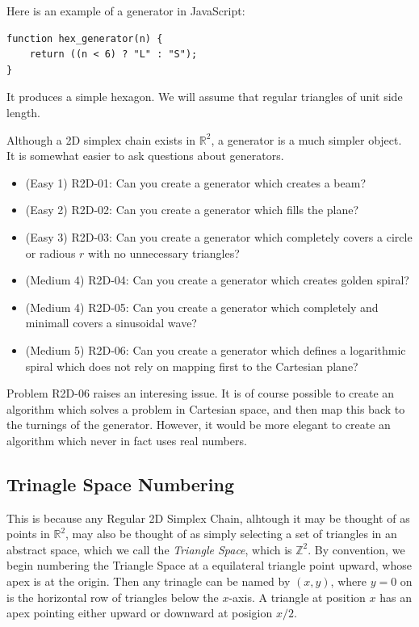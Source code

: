 \documentclass[11pt]{article}
\begin{document}
  Here is an example of a generator in JavaScript:
\begin{verbatim}
function hex_generator(n) {
    return ((n < 6) ? "L" : "S");
}
\end{verbatim}
It produces a simple hexagon. We will assume that regular triangles of unit side length.

Although a 2D simplex chain exists in $\mathbb{R}^2$, a generator is a much simpler object.  It is somewhat easier to ask questions about
generators.

\begin{itemize}
\item (Easy 1) R2D-01: Can you create a generator which creates a beam?
\item (Easy 2) R2D-02: Can you create a generator which fills the plane?
\item (Easy 3) R2D-03: Can you create a generator which completely covers a circle or radious $r$ with no unnecessary triangles?
\item (Medium 4) R2D-04: Can you create a generator which creates golden spiral?
\item (Medium 4) R2D-05: Can you create a generator which completely and minimall covers a sinusoidal wave?
  \item (Medium 5) R2D-06: Can you create a generator which defines a logarithmic spiral which does not rely on mapping first to the Cartesian plane?
\end{itemize}

Problem R2D-06 raises an interesing issue. It is of course possible to create an algorithm which solves a problem in Cartesian space, and then
map this back to the turnings of the generator. However, it would be more elegant to create an algorithm which never in fact uses real numbers.

\subsection{Trinagle Space Numbering}

This is because any Regular 2D Simplex Chain, alhtough it may be thought of as points in $\mathbb{R}^2$, may also be thought of as simply
selecting a set of triangles in an abstract space, which we call the {\em Triangle Space}, which is $\mathbb{Z}^2$. By convention,
we begin numbering the Triangle Space at a equilateral triangle point upward, whose apex is at the origin.  Then any trinagle can be
named by $(x,y)$, where $y=0$ on is the horizontal row of triangles below the $x$-axis. A triangle at position $x$ has an apex
pointing either upward or downward at posigion $x/2$.
\end{document}

